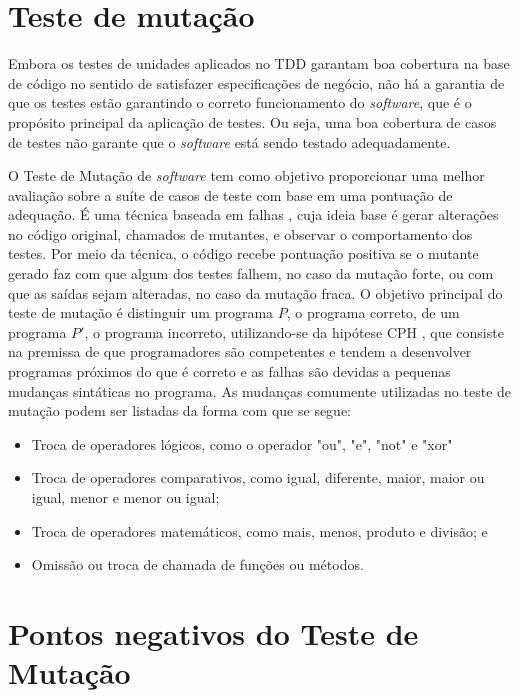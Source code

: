 \section{Teste de mutação}

Embora os testes de unidades aplicados no TDD garantam boa cobertura na base de código no sentido de satisfazer especificações de negócio, não há a garantia de que os testes estão garantindo o correto funcionamento do \textit{software}, que é o propósito principal da aplicação de testes. Ou seja, uma boa cobertura de casos de testes não garante que o \textit{software} está sendo testado adequadamente.

O Teste de Mutação de \textit{software} \cite{ieee:mutation-testing-survey} tem como objetivo proporcionar uma melhor avaliação sobre a suíte de casos de teste com base em uma pontuação de adequação. É uma técnica baseada em falhas \cite{ieee:fault-based-testing}, cuja ideia base é gerar alterações no código original, chamados de mutantes, e observar o comportamento dos testes. Por meio da técnica, o código recebe pontuação positiva se o mutante gerado faz com que algum dos testes falhem, no caso da mutação forte, ou com que as saídas sejam alteradas, no caso da mutação fraca. O objetivo principal do teste de mutação é distinguir um programa $P$, o programa correto, de um programa $P'$, o programa incorreto, utilizando-se da hipótese CPH \cite{ieee:hints-on-test-data}, que consiste na premissa de que programadores são competentes e tendem a desenvolver programas próximos do que é correto e as falhas são devidas a pequenas mudanças sintáticas no programa. As mudanças comumente utilizadas no teste de mutação podem ser listadas da forma com que se segue:

\begin{itemize}
    \item Troca de operadores lógicos, como o operador "ou", "e", "not" e "xor"
    \item Troca de operadores comparativos, como igual, diferente, maior, maior ou igual, menor e menor ou igual;
    \item Troca de operadores matemáticos, como mais, menos, produto e divisão; e
    \item Omissão ou troca de chamada de funções ou métodos.
\end{itemize}

\section{Pontos negativos do Teste de Mutação}


